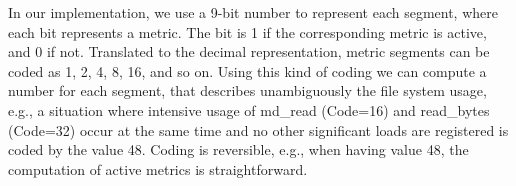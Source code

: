 \documentclass{jhps}
\begin{document}
In our implementation, we use a 9-bit number to represent each segment, where each bit represents a metric.
The bit is 1 if the corresponding metric is active, and 0 if not.
Translated to the decimal representation, metric segments can be coded as 1, 2, 4, 8, 16, and so on.
Using this kind of coding we can compute a number for each segment, that describes unambiguously the file system usage, e.g., a situation where intensive usage of md\_read (Code=16) and read\_bytes (Code=32) occur at the same time and no other significant loads are registered is coded by the value 48.
Coding is reversible, e.g., when having value 48, the computation of active metrics is straightforward.

\end{document}
